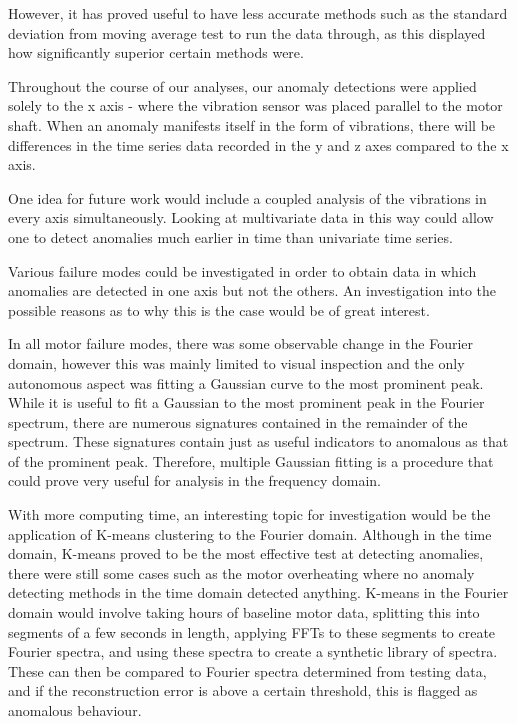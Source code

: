 However, it has proved useful to have less accurate methods such as the standard deviation from moving average test to run the data through, as this displayed how significantly superior certain methods were.

Throughout the course of our analyses, our anomaly detections were applied solely to the x axis - where the vibration sensor was placed parallel to the motor shaft. When an anomaly manifests itself in the form of vibrations, there will be differences in the time series data recorded in the y and z axes compared to the x axis.

One idea for future work would include a coupled analysis of the vibrations in every axis simultaneously. Looking at multivariate data in this way could allow one to detect anomalies much earlier in time than univariate time series.

Various failure modes could be investigated in order to obtain data in which anomalies are detected in one axis but not the others. An investigation into the possible reasons as to why this is the case would be of great interest.


In all motor failure modes, there was some observable change in the Fourier domain, however this was mainly limited to visual inspection and the only autonomous aspect was fitting a Gaussian curve to the most prominent peak. While it is useful to fit a Gaussian to the most prominent peak in the Fourier spectrum, there are numerous signatures contained in the remainder of the spectrum. These signatures contain just as useful indicators to anomalous as that of the prominent peak. Therefore, multiple Gaussian fitting is a procedure that could prove very useful for analysis in the frequency domain.

With more computing time, an interesting topic for investigation would be the application of K-means clustering to the Fourier domain. Although in the time domain, K-means proved to be the most effective test at detecting anomalies, there were still some cases such as the motor overheating where no anomaly detecting methods in the time domain detected anything. K-means in the Fourier domain would involve taking hours of baseline motor data, splitting this into segments of a few seconds in length, applying FFTs to these segments to create Fourier spectra, and using these spectra to create a synthetic library of spectra. These can then be compared to Fourier spectra determined from testing data, and if the reconstruction error is above a certain threshold, this is flagged as anomalous behaviour.


